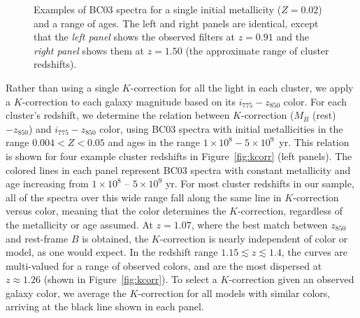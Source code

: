 \begin{figure}[t]
\begin{center}
\end{center}
\caption[Examples of Bruzual \& Charlot (2003) spectra]{Examples
of BC03 spectra for a single initial metallicity ($Z =
0.02$) and a range of ages. The left and right panels are identical,
except that the \emph{left panel} shows the observed filters at $z=0.91$ and
the \emph{right panel} shows them at $z=1.50$ (the approximate range
of cluster redshifts).\label{fig:bc03spectra}}
\end{figure}

Rather than using a single $K$-correction for all the light in each
cluster, we apply a $K$-correction to each galaxy magnitude based on
its $i_{775}-z_{850}$ color. For each cluster's redshift, we determine
the relation between $K$-correction ($M_B$ (rest) $- z_{850}$) and
$i_{775}-z_{850}$ color, using BC03 spectra with initial metallicities
in the range $0.004 < Z < 0.05$ and ages in the range $1 \times 10^8 -
5 \times 10^9$~yr. This relation is shown for four example cluster
redshifts in Figure~\ref{fig:kcorr} (left panels). The colored lines
in each panel represent BC03 spectra with constant metallicity and age
increasing from $1 \times 10^8$ -- $5 \times 10^9$ yr.  For most
cluster redshifts in our sample, all of the spectra over this wide
range fall along the same line in $K$-correction versus color, meaning
that the color determines the $K$-correction, regardless of the
metallicity or age assumed. At $z=1.07$, where the best match between
$z_{850}$ and rest-frame $B$ is obtained, the $K$-correction is nearly
independent of color or model, as one would expect. In the redshift
range $1.15 \lesssim z \lesssim 1.4$, the curves are multi-valued for
a range of observed colors, and are the most dispersed at $z \approx
1.26$ (shown in Figure~\ref{fig:kcorr}). To select a $K$-correction
given an observed galaxy color, we average the $K$-correction for all
models with similar colors, arriving at the black line shown in each
panel.

